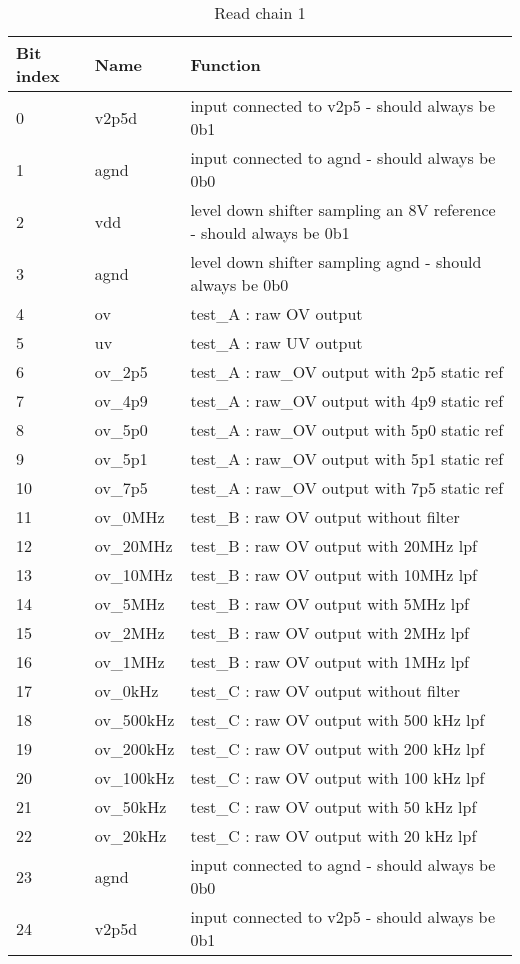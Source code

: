\begin{table}[!htbp]
\centering
\begin{tabular}{@{}lll@{}}
\toprule
Bit index	& Name    & Function                                          \\ \toprule
0	        & v2p5d	  & input connected to v2p5 - should always be 0b1 \\
1         &	agnd    &	input connected to agnd - should always be 0b0 \\
2         &	vdd     &	level down shifter sampling an 8V reference - should always be 0b1 \\
3         &	agnd    &	level down shifter sampling agnd - should always be 0b0 \\
4         &	ov      &	test\_A : raw OV output \\
5         &	uv      &	test\_A : raw UV output \\
6         &	ov\_2p5  & test\_A : raw_OV output with 2p5 static ref \\
7         &	ov\_4p9  &	test\_A : raw_OV output with 4p9 static ref \\
8         &	ov\_5p0	& test\_A : raw_OV output with 5p0 static ref \\
9         &	ov\_5p1  &	test\_A : raw_OV output with 5p1 static ref \\
10        &	ov\_7p5  &	test\_A : raw_OV output with 7p5 static ref \\
11        &	ov\_0MHz	& test\_B : raw OV output without filter \\
12        &	ov\_20MHz&	test\_B : raw OV output with 20MHz lpf \\
13        &	ov\_10MHz&	test\_B : raw OV output with 10MHz lpf \\
14	      & ov\_5MHz &	test\_B : raw OV output with 5MHz lpf \\
15        &	ov\_2MHz	& test\_B : raw OV output with 2MHz lpf \\
16        &	ov\_1MHz	& test\_B : raw OV output with 1MHz lpf \\
17        &	ov\_0kHz	& test\_C : raw OV output without filter \\
18        &	ov\_500kHz	& test\_C : raw OV output with 500 kHz lpf \\
19        &	ov\_200kHz	& test\_C : raw OV output with 200 kHz lpf \\
20	      & ov\_100kHz	& test\_C : raw OV output with 100 kHz lpf \\
21	      & ov\_50kHz	& test\_C : raw OV output with 50 kHz lpf \\
22        &	ov\_20kHz	& test\_C : raw OV output with 20 kHz lpf \\
23	      & agnd	    & input connected to agnd - should always be 0b0 \\
24	      & v2p5d	    & input connected to v2p5 - should always be 0b1 \\
\bottomrule
\end{tabular}
\caption{Read chain 1}
\label{tab:read-chain-1}
\end{table}


